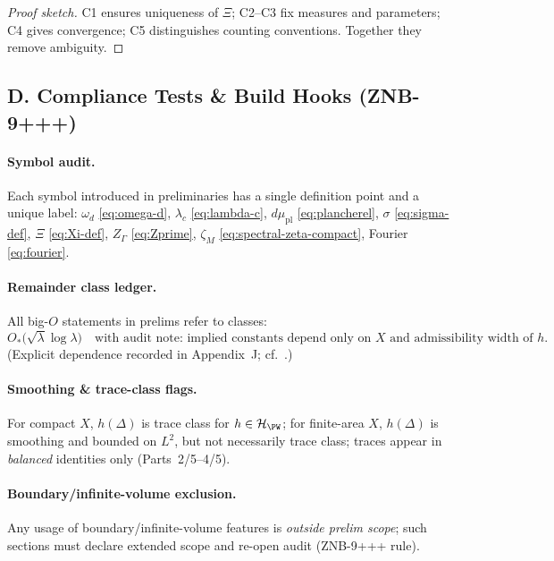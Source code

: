 \begin{proof}[Proof sketch]
C1 ensures uniqueness of $\Xi$; C2–C3 fix measures and parameters; C4 gives convergence; C5 distinguishes counting conventions. Together they remove ambiguity.\qedhere
\end{proof}


\subsection*{D. Compliance Tests \& Build Hooks (ZNB-9+++)}
\label{subsec:compliance}

\paragraph{Symbol audit.}
Each symbol introduced in preliminaries has a single definition point and a unique label:
$\omega_d$ \eqref{eq:omega-d}, $\lambda_c$ \eqref{eq:lambda-c}, $d\mu_{\mathrm{pl}}$ \eqref{eq:plancherel}, $\sigma$ \eqref{eq:sigma-def}, $\Xi$ \eqref{eq:Xi-def}, $Z_\Gamma$ \eqref{eq:Zprime}, $\zeta_M$ \eqref{eq:spectral-zeta-compact}, Fourier \eqref{eq:fourier}.

\paragraph{Remainder class ledger.}
All big-$O$ statements in prelims refer to classes:
\[
  O_{\!\!*}\!\big(\sqrt{\lambda}\log \lambda\big) 
  \quad\text{with audit note: implied constants depend only on } X \text{ and admissibility width of } h.
\]
(Explicit dependence recorded in Appendix~J; cf.\ \cite{Hejhal1983,Hejhal1983II}.)

\paragraph{Smoothing \& trace-class flags.}
For compact $X$, $h(\Delta)$ is trace class for $h\in \mathcal H_{\PW}$; for finite-area $X$, $h(\Delta)$ is smoothing and bounded on $L^2$, but not necessarily trace class; traces appear in \emph{balanced} identities only (Parts~2/5–4/5).

\paragraph{Boundary/infinite-volume exclusion.}
Any usage of boundary/infinite-volume features is \emph{outside prelim scope}; such sections must declare extended scope and re-open audit (ZNB-9+++ rule).

